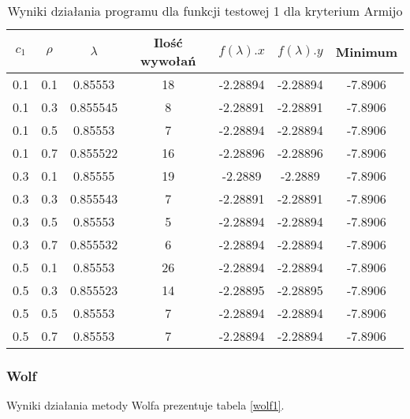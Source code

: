 \documentclass{classrep}
\begin{document}
\begin{table}
  \centering
  \caption{Wyniki działania programu dla funkcji testowej 1 dla kryterium Armijo}
  \label{armijo1}
  \begin{tabular}{|c|c|c|c|c|c|c|}
    \hline
    $c_1$ & $\rho$ & $\lambda$ & Ilość wywołań & $f(\lambda).x$ & $f(\lambda).y$ & Minimum \\
    \hline
    0.1 & 0.1 & 0.85553 & 18 & -2.28894 & -2.28894 & -7.8906 \\
    0.1 & 0.3 & 0.855545 & 8 & -2.28891 & -2.28891 & -7.8906 \\
    0.1 & 0.5 & 0.85553 & 7 & -2.28894 & -2.28894 & -7.8906 \\
    0.1 & 0.7 & 0.855522 & 16 & -2.28896 & -2.28896 & -7.8906 \\
    0.3 & 0.1 & 0.85555 & 19 & -2.2889 & -2.2889 & -7.8906 \\
    0.3 & 0.3 & 0.855543 & 7 & -2.28891 & -2.28891 & -7.8906 \\
    0.3 & 0.5 & 0.85553 & 5 & -2.28894 & -2.28894 & -7.8906 \\
    0.3 & 0.7 & 0.855532 & 6 & -2.28894 & -2.28894 & -7.8906 \\
    0.5 & 0.1 & 0.85553 & 26 & -2.28894 & -2.28894 & -7.8906 \\
    0.5 & 0.3 & 0.855523 & 14 & -2.28895 & -2.28895 & -7.8906 \\
    0.5 & 0.5 & 0.85553 & 7 & -2.28894 & -2.28894 & -7.8906 \\
    0.5 & 0.7 & 0.85553 & 7 & -2.28894 & -2.28894 & -7.8906 \\
    \hline
  \end{tabular}
\end{table}

\subsubsection{Wolf}

Wyniki działania metody Wolfa prezentuje tabela \ref{wolf1}.
\end{document}
